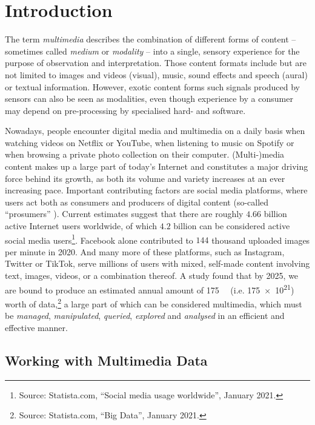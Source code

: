 \chapter{Introduction}
\label{chapter:introduction}

The term \emph{multimedia} describes the combination of different forms of content -- sometimes called \emph{medium} or \emph{modality} -- into a single, sensory experience for the purpose of observation and interpretation. Those content formats include but are not limited to images and videos (visual), music, sound effects and speech (aural) or textual information. However, exotic content forms such signals produced by sensors can also be seen as modalities, even though experience by a consumer may depend on pre-processing by specialised hard- and software.

Nowadays, people encounter digital media and multimedia on a daily basis when watching videos on Netflix or YouTube, when listening to music on Spotify or when browsing a private photo collection on their computer. (Multi-)media content makes up a large part of today's Internet and constitutes a major driving force behind its growth, as both its volume and variety increases at an ever increasing pace. Important contributing factors are social media platforms, where users act both as consumers and producers of digital content (so-called ``prosumers'' \cite{Ritzer:2010Production,Ritzer2012:Coming}). Current estimates suggest that there are roughly $4.66$ billion active Internet users worldwide, of which $4.2$ billion can be considered active social media users\footnote{Source: Statista.com, ``Social media usage worldwide'', January 2021.}. Facebook alone contributed to $144$ thousand uploaded images per minute in 2020. And many more of these  platforms, such as Instagram, Twitter or TikTok, serve millions of users with mixed, self-made content involving text, images, videos, or a combination thereof. A study found that by 2025, we are bound to produce an estimated annual amount of \SI{175}{\zetta\byte} (i.e. \SI{175e21}{\byte}) worth of data,\footnote{Source: Statista.com, ``Big Data'', January 2021.} a large part of which can be considered multimedia, which must be \emph{managed}, \emph{manipulated}, \emph{queried}, \emph{explored} and \emph{analysed} in an efficient and effective manner.

\section{Working with Multimedia Data}

